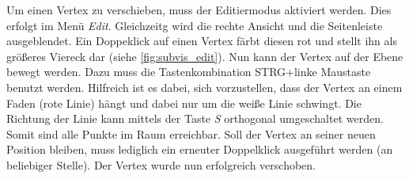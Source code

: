 Um einen Vertex zu verschieben, muss der Editiermodus aktiviert werden. 
Dies erfolgt im Menü \emph{Edit}.
Gleichzeitg wird die rechte Ansicht und die Seitenleiste ausgeblendet.
Ein Doppeklick auf einen Vertex färbt diesen rot und stellt ihn als größeres Viereck dar (siehe \autoref{fig:subvis_edit}).
Nun kann der Vertex auf der Ebene bewegt werden. 
Dazu muss die Tastenkombination STRG+linke Maustaste benutzt werden.
Hilfreich ist es dabei, sich vorzustellen, dass der Vertex an einem Faden (rote Linie) hängt und dabei nur um die weiße Linie schwingt.
Die Richtung der Linie kann mittels der Taste \emph{S} orthogonal umgeschaltet werden. 
Somit sind alle Punkte im Raum erreichbar.
Soll der Vertex an seiner neuen Position bleiben, muss lediglich ein erneuter Doppelklick ausgeführt werden (an beliebiger Stelle).
Der Vertex wurde nun erfolgreich verschoben.






























